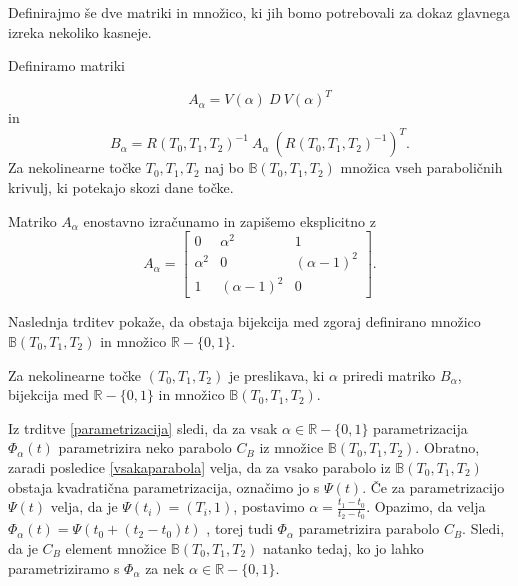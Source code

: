 \documentclass[mat1]{fmfdelo}
\newcommand{\R}{\mathbb R}
\newcommand{\B}{\mathbb B}
\newcommand{\al}{\alpha}
\begin{document}
Definirajmo še dve matriki in množico, ki jih bomo potrebovali za dokaz glavnega izreka nekoliko kasneje.

\begin{definicija}
Definiramo matriki

$$A_{\al} = V(\al) \ D \ V(\al)^T $$
in
$$B_{\al} =  R(T_0, T_1, T_2)^{-1}\  A_{\al} \  (R(T_0, T_1, T_2)^{-1})^T.$$
Za nekolinearne točke $T_0, T_1, T_2$ naj bo $\B(T_0, T_1, T_2)$ množica vseh paraboličnih krivulj, ki potekajo skozi dane točke.

\end{definicija}

\begin{opomba}
Matriko $A_\al$ enostavno izračunamo in zapišemo eksplicitno z %
$$A_\al = 
\begin{bmatrix}
0 & \al^2 & 1 \\
\al^2 & 0 & (\al - 1)^2 \\
1 & (\al -1)^2 & 0
\end{bmatrix}
.$$

\end{opomba}

Naslednja trditev pokaže, da obstaja bijekcija med zgoraj definirano množico $\B(T_0, T_1, T_2)$ in množico $\R - \{0, 1\}$.

\begin{trditev}
Za nekolinearne točke $(T_0, T_1, T_2)$ je preslikava, ki $\al$ priredi matriko $B_{\al}$, bijekcija med $\R - \{0, 1\}$ in množico $\B(T_0, T_1, T_2)$.
\end{trditev}





\begin{dokaz}
Iz trditve \ref{parametrizacija} sledi, da za vsak $\al \in \R - \{0,1 \}$ parametrizacija $\Phi_\al(t)$ parametrizira neko parabolo $C_B$ iz množice $\B(T_0, T_1, T_2)$.
Obratno, zaradi posledice \ref{vsakaparabola} velja, da za vsako parabolo iz $\B(T_0, T_1, T_2)$ obstaja kvadratična parametrizacija, označimo jo s $\Psi(t)$.
Če za parametrizacijo $\Psi(t)$ velja, da je $\Psi(t_i) = (T_i, 1)$, postavimo $\al = \frac{t_1 - t_0}{t_2 - t_0}$.
Opazimo, da velja $\Phi_\al(t) = \Psi(t_0 + (t_2 - t_0)t)$ 
, torej tudi $\Phi_\al$ parametrizira parabolo $C_B$. Sledi, da je $C_B$ element množice $\B(T_0, T_1, T_2)$ natanko tedaj, ko jo lahko parametriziramo s $\Phi_\al$ za nek $\al \in \R - \{0,1 \}$.
\end{dokaz}
\end{document}
